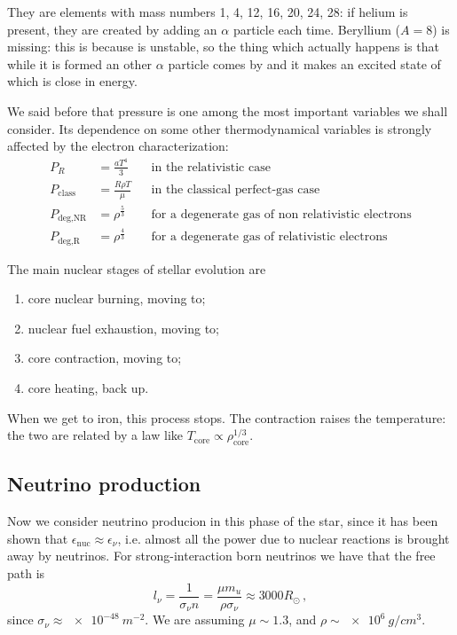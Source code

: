 \documentclass[main.tex]{subfiles}
\begin{document}
\begin{bluebox}
They are elements with mass numbers 1, 4, 12, 16, 20, 24, 28: if helium is present, they are created by adding an \(\alpha \) particle each time. Beryllium (\(A = 8\)) is missing: this is because  is unstable, so the thing which actually happens is that while it is formed an other \(\alpha \) particle comes by and it makes an excited state of  which is close in energy.
\end{bluebox}
    
We said before that pressure is one among the most important variables we shall consider. Its dependence on some other thermodynamical variables is strongly affected by the electron characterization:
%
\begin{subequations}
\begin{align}
P_R &=\frac{aT^4}{3} && \text{in the relativistic case}\\
P_{\text{class}} &=\frac{R\rho T}{\mu} && \text{in the classical perfect-gas case}\\
P_{\text{deg,NR}} &=\rho^{\frac{5}{3}} && \text{for a degenerate gas of non relativistic electrons} \\
P_{\text{deg,R}} &=\rho^{\frac{4}{3}} && \text{for a degenerate gas of relativistic electrons}
\end{align}
\end{subequations}

The main nuclear stages of stellar evolution are 
\begin{enumerate}
    \item core nuclear burning, moving to;
    \item nuclear fuel exhaustion, moving to;
    \item core contraction, moving to;
    \item core heating, back up.
\end{enumerate}

When we get to iron, this process stops.
The contraction raises the temperature: the two are related by a law like \(T _{\text{core}} \propto \rho _{\text{core}}^{1/3}\). 

\subsection{Neutrino production}

Now we consider neutrino producion in this phase of the star, since it has been shown that $\epsilon_{\text{nuc}}\approx \epsilon_\nu$, i.e. almost all the power due to nuclear reactions is brought away by neutrinos.
For strong-interaction born neutrinos we have that the free path is
%
\begin{equation}
    l_\nu=\frac{1}{\sigma_\nu n}=\frac{\mu m_u}{\rho\sigma_\nu}\approx 3000 R_{\odot}\,,
\end{equation}
%
since \(\sigma_{\nu } \approx \SI{e-48}{m^{-2}}\).
We are assuming \(\mu \sim 1.3\), and \(\rho \sim \SI{e6}{g/cm^3}\).
\end{document}
